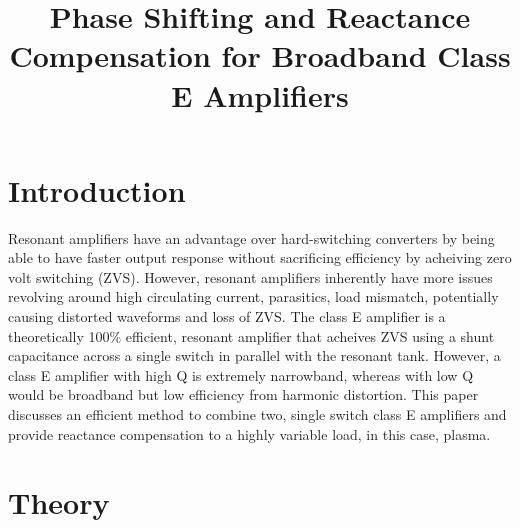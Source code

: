 \documentclass [twocolumn]{article}
\title{Phase Shifting and Reactance Compensation for Broadband Class E Amplifiers}
\begin{document}
\maketitle

\section{Introduction}
Resonant amplifiers have an advantage over hard-switching converters by being able to have faster output response without sacrificing efficiency by acheiving zero volt switching (ZVS). However, resonant amplifiers inherently have more issues revolving around high circulating current, parasitics, load mismatch, potentially causing distorted waveforms and loss of ZVS. The class E amplifier is a theoretically 100\% efficient, resonant amplifier that acheives ZVS using a shunt capacitance across a single switch in parallel with the resonant tank. However, a class E amplifier with high Q is extremely narrowband, whereas with low Q would be broadband but low efficiency from harmonic distortion. This paper discusses an efficient method to combine two, single switch class E amplifiers and provide reactance compensation to a highly variable load, in this case, plasma. 

\section{Theory}
\end{document}
